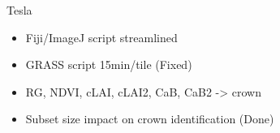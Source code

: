 \documentclass[serif,mathserif,aspectratio=169]{beamer}
\begin{document}
{
\begin{frame}[plain]
\begin{shaded}
\Huge Tesla
\end{shaded}
\end{frame}}


\begin{frame}
\begin{center}
\begin{itemize}
 \item Fiji/ImageJ script streamlined
 \item GRASS script 15min/tile (Fixed)
 \item RG, NDVI, cLAI, cLAI2, CaB, CaB2 -> crown 
 \item Subset size impact on crown identification (Done)
\end{itemize}
\end{center}
\end{frame}

\end{document}
